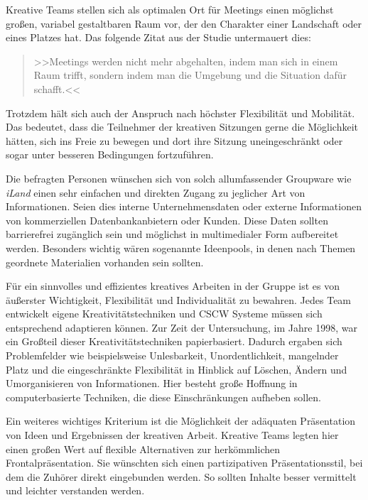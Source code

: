 Kreative Teams stellen sich als optimalen Ort für Meetings einen möglichst großen, variabel gestaltbaren Raum vor, der den Charakter einer Landschaft oder eines Platzes hat. Das folgende Zitat aus der Studie untermauert dies: 

\medskip\begin{quote}
	>>Meetings werden nicht mehr abgehalten, indem man sich in einem Raum trifft, sondern indem man die Umgebung und die Situation dafür schafft.<< 
\end{quote}
\begin{flushright}
	\citep{Streitz:1998p198}
\end{flushright}

\medskip Trotzdem hält sich auch der Anspruch nach höchster Flexibilität und Mobilität. Das bedeutet, dass die Teilnehmer der kreativen Sitzungen gerne die Möglichkeit hätten, sich ins Freie zu bewegen und dort ihre Sitzung uneingeschränkt oder sogar unter besseren Bedingungen fortzuführen.

Die befragten Personen wünschen sich von solch allumfassender Groupware wie \emph{iLand} einen sehr einfachen und direkten Zugang zu jeglicher Art von Informationen. Seien dies interne Unternehmensdaten oder externe Informationen von kommerziellen Datenbankanbietern oder Kunden. Diese Daten sollten barrierefrei zugänglich sein und möglichst in multimedialer Form aufbereitet werden. Besonders wichtig wären sogenannte Ideenpools, in denen nach Themen geordnete Materialien vorhanden sein sollten. 

Für ein sinnvolles und effizientes kreatives Arbeiten in der Gruppe ist es von äußerster Wichtigkeit, Flexibilität und Individualität zu bewahren. Jedes Team entwickelt eigene Kreativitätstechniken und \ac{CSCW} Systeme müssen sich entsprechend adaptieren können. Zur Zeit der Untersuchung, im Jahre 1998, war ein Großteil dieser Kreativitätstechniken papierbasiert. Dadurch ergaben sich Problemfelder wie beispielsweise Unlesbarkeit, Unordentlichkeit, mangelnder Platz und die eingeschränkte Flexibilität in Hinblick auf Löschen, Ändern und Umorganisieren von Informationen. Hier besteht große Hoffnung in computerbasierte Techniken, die diese Einschränkungen aufheben sollen.

Ein weiteres wichtiges Kriterium ist die Möglichkeit der adäquaten Präsentation von Ideen und Ergebnissen der kreativen Arbeit. Kreative Teams legten hier einen großen Wert auf flexible Alternativen zur herkömmlichen Frontalpräsentation. Sie wünschten sich einen partizipativen Präsentationsstil, bei dem die Zuhörer direkt eingebunden werden. So sollten Inhalte besser vermittelt und leichter verstanden werden.

